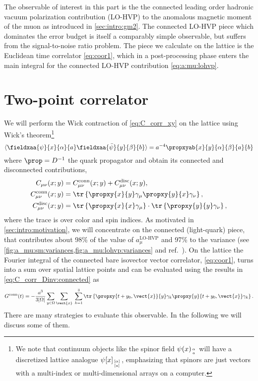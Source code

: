 The observable of interest in this part is the the connected leading order hadronic vacuum polarization contribution (LO-HVP) to the anomalous magnetic moment of the muon as introduced in \cref{sec:intro:gm2}.
The connected LO-HVP piece which dominates the error budget is itself a comparably simple observable, but suffers from the signal-to-noise ratio problem.
The piece we calculate on the lattice is the Euclidean time correlator \cref{eq:coor1}, which in a post-processing phase enters the main integral for the connected LO-HVP contribution \cref{eq:a:mu:lohvp}.


\section{Two-point correlator}
\label{sec:2pt-corr}

We will perform the Wick contraction of \cref{eq:C_corr_xy} on the lattice using Wick's theorem\footnote{We note that continuum objects like the spinor field $\psi(x)_{\alpha \atop a}$ will have a discretized lattice analogue $\psi[x]_{[\alpha] \atop [a]}$, emphasizing that spinors are just vectors with a multi-index or multi-dimensional arrays on a computer.}
\begin{equation}
\langle \fieldxaa{\psi}{x}{\alpha}{a} \fieldxaa{\bar{\psi}}{y}{\beta}{b} \rangle =
a^{-4} \propxyab{x}{y}{\alpha}{\beta}{a}{b}
\end{equation}
where $\prop = D^{-1}$ the quark propagator and obtain its connected and disconnected contributions,
\begin{align}
C_{\mu \nu}(x;y) &= C_{\mu \nu}^{\text{conn}}(x;y) + C_{\mu \nu}^{\text{disc}}(x;y), \\
C_{\mu \nu}^{\text{conn}}(x;y) &=
\tr \left\{
  \propxy{x}{y} \gamma_{\mu} \propxy{y}{x} \gamma_{\nu}
\right\}, \label{eq:C_corr_Dinv:connected} \\
C_{\mu \nu}^{\text{disc}}(x;y) &=
\tr \left\{ \propxy{x}{x} \gamma_{\mu} \right\}
\cdot
\tr \left\{ \propxy{y}{y} \gamma_{\nu} \right\},
\end{align}
where the trace is over color and spin indices.
As motivated in \cref{sec:intro:motivation}, we will concentrate on the connected (light-quark) piece, that contributes about 98\% of the value of $a_{\mu}^{\text{LO-HVP}}$ and 97\% to the variance (see \cref{fig:a_mu:sm:variances,fig:a_mu:lohvp:variances} and ref.~\cite{snowmass:2025}).
On the lattice the Fourier integral of the connected bare isovector vector correlator, \cref{eq:coor1}, turns into a sum over spatial lattice points and can be evaluated using the results in \cref{eq:C_corr_Dinv:connected} as
\begin{equation} \label{eq:G:corr:connected}
G^{\text{conn}}(t) =
- \frac{a^{3}}{3 \lvert \Omega \rvert}
\sum_{y \in \Omega}
\sum_{\vect{x}} \;
\sum_{k=1}^{3}
\tr \left\{
  \propxy{t+y_0, \vect{x}}{y} \gamma_k \propxy{y}{t+y_0, \vect{x}} \gamma_k
\right\}.
\end{equation}
There are many strategies to evaluate this observable. In the following we will discuss some of them.

